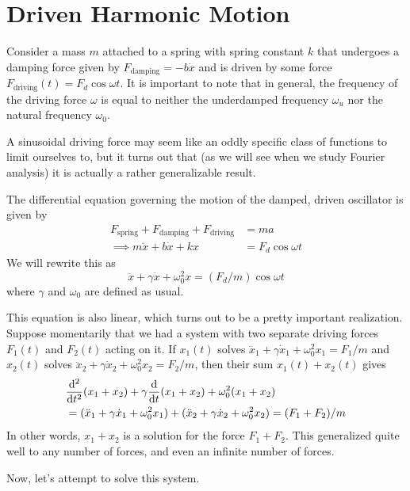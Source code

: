 \section{Driven Harmonic Motion}
Consider a mass $m$ attached to a spring with spring constant $k$ that undergoes a damping force given by $F_\text{damping} = -b\dot x$ and is driven by some force $F_\text{driving}(t) = F_d  \cos\omega t$. It is important to note that in general, the frequency of the driving force $\omega$ is equal to neither the underdamped frequency $\omega_u$ nor the natural frequency $\omega_0$.

A sinusoidal driving force may seem like an oddly specific class of functions to limit ourselves to, but it turns out that (as we will see when we study Fourier analysis) it is actually a rather generalizable result.

The differential equation governing the motion of the damped, driven oscillator is given by
\begin{align}
    F_\text{spring} + F_\text{damping} + F_\text{driving} &= ma \nonumber \\
    \implies m\ddot x + b\dot x + kx &= F_d\cos\omega t \label{unfixed}
\end{align}
We will rewrite this as
\begin{equation} \label{realversion}
    \ddot x + \gamma \dot x + \omega_0^2x=(F_d/m)\cos\omega t
\end{equation}
where $\gamma$ and $\omega_0$ are defined as usual.

This equation is also linear, which turns out to be a pretty important realization. Suppose momentarily that we had a system with two separate driving forces $F_1(t)$ and $F_2(t)$ acting on it. If $x_1(t)$ solves $\ddot x_1 + \gamma \dot x_1 + \omega_0^2x_1 = F_1/m$ and $x_2(t)$ solves $\ddot x_2 + \gamma \dot x_2 + \omega_0^2x_2 = F_2/m$, then their sum $x_1(t) + x_2(t)$ gives
\begin{align*}
    &\dv[2]{t}(x_1 + x_2) + \gamma\dv{t}(x_1+x_2) + \omega_0^2(x_1+x_2) \\
    &= (\ddot x_1 + \gamma \dot x_1 + \omega_0^2x_1) + (\ddot x_2 +  \gamma\dot x_2 + \omega_0^2x_2) = (F_1+F_2)/m
\end{align*}
In other words, $x_1+x_2$ is a solution for the force $F_1+F_2$. This generalized quite well to any number of forces, and even an infinite number of forces.

Now, let's attempt to solve this system.
